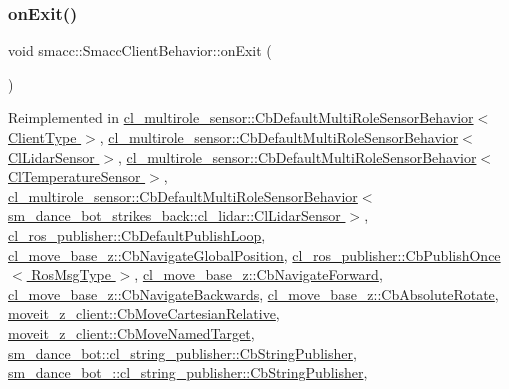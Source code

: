\subsubsection{\texorpdfstring{on\+Exit()}{onExit()}}
{\footnotesize\ttfamily void smacc\+::\+Smacc\+Client\+Behavior\+::on\+Exit (\begin{DoxyParamCaption}{ }\end{DoxyParamCaption})\hspace{0.3cm}{\ttfamily [virtual]}}



Reimplemented in \hyperlink{classcl__multirole__sensor_1_1CbDefaultMultiRoleSensorBehavior_a0f400c7e29d0cb1dda11242a5a922f4c}{cl\+\_\+multirole\+\_\+sensor\+::\+Cb\+Default\+Multi\+Role\+Sensor\+Behavior$<$ Client\+Type $>$}, \hyperlink{classcl__multirole__sensor_1_1CbDefaultMultiRoleSensorBehavior_a0f400c7e29d0cb1dda11242a5a922f4c}{cl\+\_\+multirole\+\_\+sensor\+::\+Cb\+Default\+Multi\+Role\+Sensor\+Behavior$<$ Cl\+Lidar\+Sensor $>$}, \hyperlink{classcl__multirole__sensor_1_1CbDefaultMultiRoleSensorBehavior_a0f400c7e29d0cb1dda11242a5a922f4c}{cl\+\_\+multirole\+\_\+sensor\+::\+Cb\+Default\+Multi\+Role\+Sensor\+Behavior$<$ Cl\+Temperature\+Sensor $>$}, \hyperlink{classcl__multirole__sensor_1_1CbDefaultMultiRoleSensorBehavior_a0f400c7e29d0cb1dda11242a5a922f4c}{cl\+\_\+multirole\+\_\+sensor\+::\+Cb\+Default\+Multi\+Role\+Sensor\+Behavior$<$ sm\+\_\+dance\+\_\+bot\+\_\+strikes\+\_\+back\+::cl\+\_\+lidar\+::\+Cl\+Lidar\+Sensor $>$}, \hyperlink{classcl__ros__publisher_1_1CbDefaultPublishLoop_a206c6bc09e7c6414304b679ec415c19f}{cl\+\_\+ros\+\_\+publisher\+::\+Cb\+Default\+Publish\+Loop}, \hyperlink{classcl__move__base__z_1_1CbNavigateGlobalPosition_a5c18268af1e7fc236aa155a58345d5d7}{cl\+\_\+move\+\_\+base\+\_\+z\+::\+Cb\+Navigate\+Global\+Position}, \hyperlink{classcl__ros__publisher_1_1CbPublishOnce_ad82cb7d6ac69fe9b91bc955550ab92cb}{cl\+\_\+ros\+\_\+publisher\+::\+Cb\+Publish\+Once$<$ Ros\+Msg\+Type $>$}, \hyperlink{classcl__move__base__z_1_1CbNavigateForward_a2160484562ef5fb1c655fab7f990241e}{cl\+\_\+move\+\_\+base\+\_\+z\+::\+Cb\+Navigate\+Forward}, \hyperlink{classcl__move__base__z_1_1CbNavigateBackwards_a92858e20e6401051203f5dfa4aef60dc}{cl\+\_\+move\+\_\+base\+\_\+z\+::\+Cb\+Navigate\+Backwards}, \hyperlink{classcl__move__base__z_1_1CbAbsoluteRotate_a0e362b8e9f0d7de5aeee183ba4031437}{cl\+\_\+move\+\_\+base\+\_\+z\+::\+Cb\+Absolute\+Rotate}, \hyperlink{classmoveit__z__client_1_1CbMoveCartesianRelative_a539af37d16cffdc51127c7a5206504cb}{moveit\+\_\+z\+\_\+client\+::\+Cb\+Move\+Cartesian\+Relative}, \hyperlink{classmoveit__z__client_1_1CbMoveNamedTarget_ab91985b232e1185b4b102bb309f65ffc}{moveit\+\_\+z\+\_\+client\+::\+Cb\+Move\+Named\+Target}, \hyperlink{classsm__dance__bot_1_1cl__string__publisher_1_1CbStringPublisher_ac93cc1eb150140331cb3e560ec8249e2}{sm\+\_\+dance\+\_\+bot\+::cl\+\_\+string\+\_\+publisher\+::\+Cb\+String\+Publisher}, \hyperlink{classsm__dance__bot__2_1_1cl__string__publisher_1_1CbStringPublisher_aee990acdb5ec33f1d22efafbe32216f2}{sm\+\_\+dance\+\_\+bot\+\_\+::cl\+\_\+string\+\_\+publisher\+::\+Cb\+String\+Publisher}, 